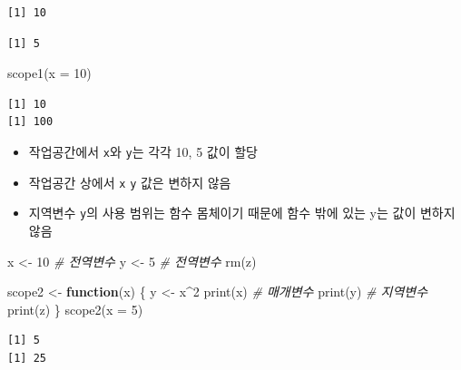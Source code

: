 \documentclass[
  11pt,
]{krantz}
\makeatletter
\newenvironment{Shaded}{\begin{snugshade}}{\end{snugshade}}
\newcommand{\AttributeTok}[1]{\textcolor[rgb]{0.61,0.61,0.61}{#1}}
\newcommand{\CommentTok}[1]{\textcolor[rgb]{0.37,0.37,0.37}{\textit{#1}}}
\newcommand{\ControlFlowTok}[1]{\textcolor[rgb]{0.27,0.27,0.27}{\textbf{#1}}}
\newcommand{\DecValTok}[1]{\textcolor[rgb]{0.06,0.06,0.06}{#1}}
\newcommand{\FunctionTok}[1]{\textcolor[rgb]{0,0,0}{#1}}
\newcommand{\NormalTok}[1]{#1}
\newcommand{\OtherTok}[1]{\textcolor[rgb]{0.37,0.37,0.37}{#1}}
\newcommand{\SpecialCharTok}[1]{\textcolor[rgb]{0,0,0}{#1}}
\providecommand{\tightlist}{%
  \setlength{\itemsep}{0pt}\setlength{\parskip}{0pt}}
\newenvironment{kframe}{%
\medskip{}
\setlength{\fboxsep}{.8em}
 \def\at@end@of@kframe{}%
 \ifinner\ifhmode%
  \def\at@end@of@kframe{\end{minipage}}%
  \begin{minipage}{\columnwidth}%
 \fi\fi%
 \def\FrameCommand##1{\hskip\@totalleftmargin \hskip-\fboxsep
 \colorbox{shadecolor}{##1}\hskip-\fboxsep
     \hskip-\linewidth \hskip-\@totalleftmargin \hskip\columnwidth}%
 \MakeFramed {\advance\hsize-\width
   \@totalleftmargin\z@ \linewidth\hsize
   \@setminipage}}%
 {\par\unskip\endMakeFramed%
 \at@end@of@kframe}
\renewenvironment{quote}{\begin{kframe}}{\end{kframe}}
\makeatother
\begin{document}
\begin{verbatim}
[1] 10
\end{verbatim}

\begin{verbatim}
[1] 5
\end{verbatim}

\begin{Shaded}
\begin{Highlighting}[]
\FunctionTok{scope1}\NormalTok{(}\AttributeTok{x =} \DecValTok{10}\NormalTok{)}
\end{Highlighting}
\end{Shaded}

\begin{verbatim}
[1] 10
[1] 100
\end{verbatim}

\normalsize

\begin{quote}
\begin{itemize}
\tightlist
\item
  작업공간에서 \texttt{x}와 \texttt{y}는 각각 10, 5 값이 할당
\item
  작업공간 상에서 \texttt{x} \texttt{y} 값은 변하지 않음
\item
  지역변수 \texttt{y}의 사용 범위는 함수 몸체이기 때문에 함수 밖에 있는 y는 값이 변하지 않음
\end{itemize}
\end{quote}

\footnotesize

\begin{Shaded}
\begin{Highlighting}[]
\NormalTok{x }\OtherTok{\textless{}{-}} \DecValTok{10} \CommentTok{\# 전역변수}
\NormalTok{y }\OtherTok{\textless{}{-}} \DecValTok{5} \CommentTok{\# 전역변수}
\FunctionTok{rm}\NormalTok{(z)}

\NormalTok{scope2 }\OtherTok{\textless{}{-}} \ControlFlowTok{function}\NormalTok{(x) \{}
\NormalTok{  y }\OtherTok{\textless{}{-}}\NormalTok{ x}\SpecialCharTok{\^{}}\DecValTok{2}
  \FunctionTok{print}\NormalTok{(x) }\CommentTok{\# 매개변수}
  \FunctionTok{print}\NormalTok{(y) }\CommentTok{\# 지역변수}
  \FunctionTok{print}\NormalTok{(z) }
\NormalTok{\}}
\FunctionTok{scope2}\NormalTok{(}\AttributeTok{x =} \DecValTok{5}\NormalTok{)}
\end{Highlighting}
\end{Shaded}

\begin{verbatim}
[1] 5
[1] 25
\end{verbatim}
\end{document}
